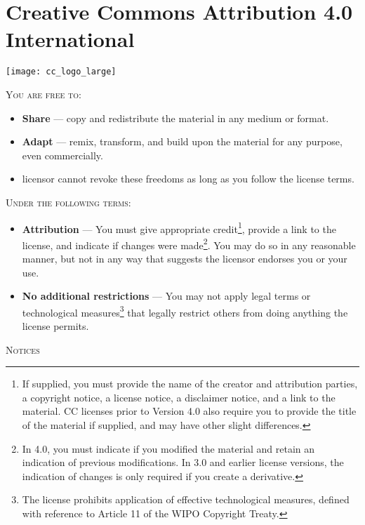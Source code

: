 \chapter{Creative Commons Attribution 4.0 International}\label{ch:creativecommons}
\thispagestyle{empty}

\begin{marginfigure}
\texttt{[image: cc\_logo\_large]}
\end{marginfigure}

\textsc{You are free to:}
\begin{itemize}
\item \textbf{Share} — copy and redistribute the material in any medium or format.
\item \textbf{Adapt} — remix, transform, and build upon the material for any purpose, even commercially.
\item licensor cannot revoke these freedoms as long as you follow the license terms.
\end{itemize}

\noindent\textsc{Under the following terms:}

\begin{itemize}
\item \textbf{Attribution} — You must give appropriate credit\footnote{If supplied, you must provide the name of the creator and attribution parties, a copyright notice, a license notice, a disclaimer notice, and a link to the material. CC licenses prior to Version 4.0 also require you to provide the title of the material if supplied, and may have other slight differences.}, provide a link to the license, and indicate if changes were made\footnote{In 4.0, you must indicate if you modified the material and retain an indication of previous modifications. In 3.0 and earlier license versions, the indication of changes is only required if you create a derivative.}. You may do so in any reasonable manner, but not in any way that suggests the licensor endorses you or your use.
\item \textbf{No additional restrictions} — You may not apply legal terms or technological measures\footnote{The license prohibits application of effective technological measures, defined with reference to Article 11 of the WIPO Copyright Treaty.} that legally restrict others from doing anything the license permits.
\end{itemize}

\textsc{Notices}

